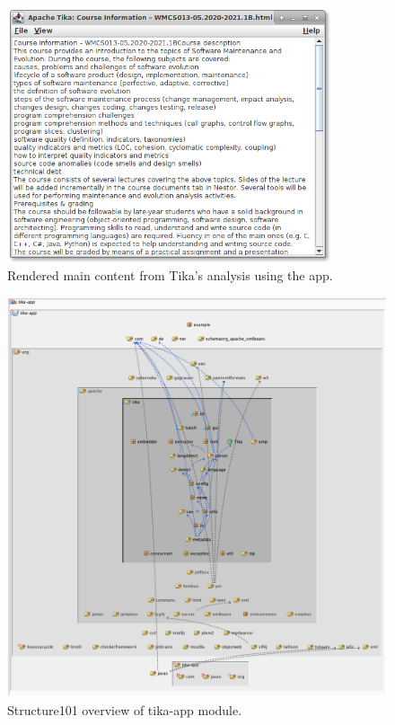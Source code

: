 \documentclass{article}
\begin{document}
\begin{figure}[ht]
    \centering
    \includegraphics[width=0.85\textwidth]{report/images/tika_app/maincontent.png}
    \caption{Rendered main content from Tika's analysis using the app.}
    \label{fig:tika_app/maincontent}
\end{figure}
\begin{figure}[ht]
    \centering
    \includegraphics[width=\textwidth]{report/images/tika_app/s101.png}
    \caption{Structure101 overview of tika-app module.}
    \label{fig:tika_app/s101}
\end{figure}
\end{document}
